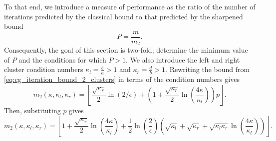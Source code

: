 To that end, we introduce a measure of performance as the ratio of the number of iterations predicted by the classical bound to that predicted by the sharpened bound
\begin{equation}
    P = \frac{m}{m_2}.
    \label{eq:performance_ratio}
\end{equation}
Consequently, the goal of this section is two-fold; determine the minimum value of $P$ and the conditions for which $P > 1$. We also introduce the left and right cluster condition numbers $\kappa_l = \frac{b}{a} > 1$ and $\kappa_r = \frac{d}{b} > 1$. Rewriting the bound from \cref{eq:cg_iteration_bound_2_clusters} in terms of the condition numbers gives
\[
    m_2(\kappa, \kappa_l, \kappa_r)=\left\lfloor\frac{\sqrt{\kappa_r}}{2} \ln (2 / \epsilon)+\left(1+\frac{\sqrt{\kappa_r}}{2} \ln \left(\frac{4\kappa}{\kappa_l}\right)\right) p\right\rfloor.
\]
Then, substituting $p$ gives
\begin{equation}
    m_2(\kappa, \kappa_l, \kappa_r)=\left\lfloor
        1 
        + \frac{\sqrt{\kappa_r}}{2}\ln\left(\frac{4\kappa}{\kappa_l}\right)
        + \frac{1}{2}\ln\left(\frac{2}{\epsilon}\right)\left(
            \sqrt{\kappa_l}
            + \sqrt{\kappa_r}
            + \sqrt{\kappa_l\kappa_r}\ln\left(\frac{4\kappa}{\kappa_l}\right)
        \right)
    \right\rfloor.
    \label{eq:cg_iteration_bound_2_clusters_condition_numbers}
\end{equation} 

